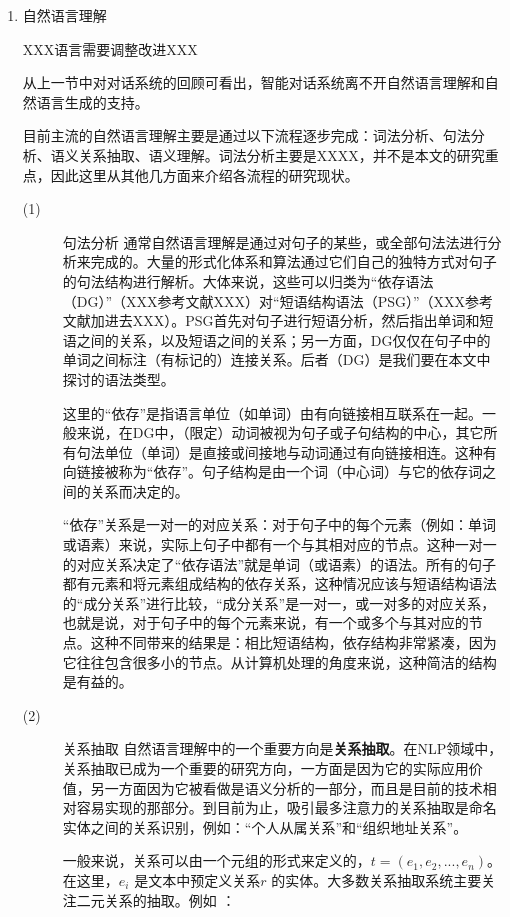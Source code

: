 \begin{enumerate}

\item{自然语言理解}

XXX语言需要调整改进XXX

从上一节中对对话系统的回顾可看出，智能对话系统离不开自然语言理解和自然语言生成的支持。

目前主流的自然语言理解主要是通过以下流程逐步完成：词法分析、句法分析、语义关系抽取、语义理解。词法分析主要是XXXX，并不是本文的研究重点，因此这里从其他几方面来介绍各流程的研究现状。


\begin{description}
\item[(1)]{句法分析}
通常自然语言理解是通过对句子的某些，或全部句法法进行分析来完成的。大量的形式化体系和算法通过它们自己的独特方式对句子的句法结构进行解析。大体来说，这些可以归类为“依存语法（DG）”（XXX参考文献XXX）对“短语结构语法（PSG）”（XXX参考文献加进去XXX）。PSG首先对句子进行短语分析，然后指出单词和短语之间的关系，以及短语之间的关系；另一方面，DG仅仅在句子中的单词之间标注（有标记的）连接关系。后者（DG）是我们要在本文中探讨的语法类型。


这里的“依存”是指语言单位（如单词）由有向链接相互联系在一起。一般来说，在DG中，（限定）动词被视为句子或子句结构的中心，其它所有句法单位（单词）是直接或间接地与动词通过有向链接相连。这种有向链接被称为“依存”。句子结构是由一个词（中心词）与它的依存词之间的关系而决定的。


“依存”关系是一对一的对应关系：对于句子中的每个元素（例如：单词或语素）来说，实际上句子中都有一个与其相对应的节点。这种一对一的对应关系决定了“依存语法”就是单词（或语素）的语法。所有的句子都有元素和将元素组成结构的依存关系，这种情况应该与短语结构语法的“成分关系”进行比较，“成分关系”是一对一，或一对多的对应关系，也就是说，对于句子中的每个元素来说，有一个或多个与其对应的节点。这种不同带来的结果是：相比短语结构，依存结构非常紧凑，因为它往往包含很多小的节点。从计算机处理的角度来说，这种简洁的结构是有益的。


\item[(2)]{关系抽取}
自然语言理解中的一个重要方向是{\bf 关系抽取}。在NLP领域中，关系抽取已成为一个重要的研究方向，一方面是因为它的实际应用价值，另一方面因为它被看做是语义分析的一部分，而且是目前的技术相对容易实现的那部分。到目前为止，吸引最多注意力的关系抽取是命名实体之间的关系识别，例如：“个人从属关系”和“组织地址关系”。

一般来说，关系可以由一个元组的形式来定义的，$t = (e_1, e_2, ...,e_n)$。在这里，$e_i$ 是文本中预定义关系$r$ 的实体。大多数关系抽取系统主要关注二元关系的抽取。例如 ：


\end{description}
\end{enumerate}
